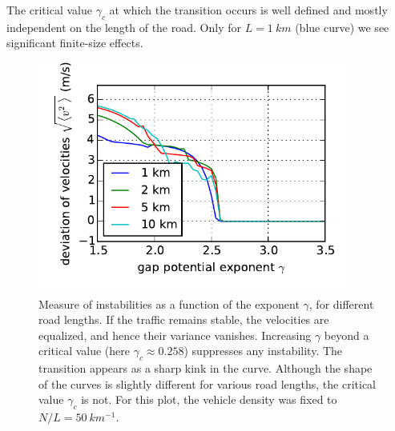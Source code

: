 The critical value $\gamma_c$ at which the transition occurs is well defined and mostly independent on the length of the road. Only for $L=\SI{1}{km}$ (blue curve) we see significant finite-size effects.
\begin{figure}
    \centering
    \includegraphics[width=4in]{../img/order_parameter_sweep.pdf}
    \caption{Measure of instabilities as a function of the exponent $\gamma$, for different road lengths. If the traffic remains stable, the velocities are equalized, and hence their variance vanishes. Increasing $\gamma$ beyond a critical value (here $\gamma_c \approx 0.258$) suppresses any instability. The transition appears as a sharp kink in the curve. Although the shape of the curves is slightly different for various road lengths, the critical value $\gamma_c$ is not. For this plot, the vehicle density was fixed to $N/L=\SI{50}{km^{-1}}$.}
    \label{fig:order_param}
\end{figure}

